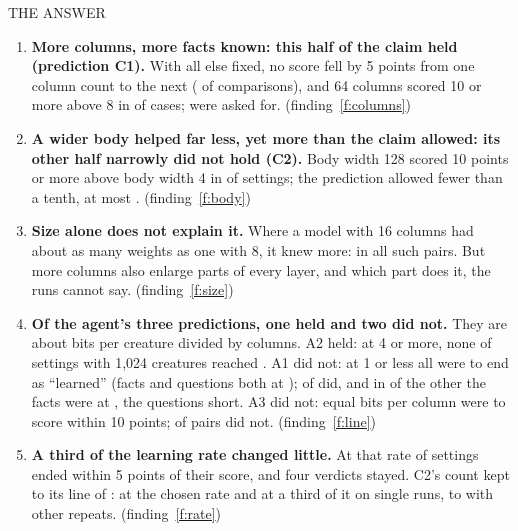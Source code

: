 \documentclass[10pt,letterpaper]{article}
\newcommand{\smallcaps}[1]{{\sffamily\fontsize{7.6}{9}\selectfont\color{second}\addfontfeature{LetterSpace=7}#1}}
\newcounter{finding}
\newcommand{\lead}[1]{\textbf{#1}}               %
\newcommand{\see}[1]{\mbox{\sffamily\footnotesize\color{second}(#1)}} %
\begin{document}
\begin{tcolorbox}[enhanced,colback=pale,colframe=pale,boxrule=0pt,arc=0pt,left=11pt,right=11pt,top=6pt,
  bottom=7pt,borderline west={2.2pt}{0pt}{ink},before skip=7pt,after skip=2pt]
\smallcaps{THE ANSWER}\par
\vspace{0.5pt}
\begin{enumerate}[leftmargin=1.35em,itemsep=2.5pt,topsep=1pt,label=\textbf{\arabic*.}]
\item \lead{More columns, more facts known: this half of the claim held (prediction C1).} With all else
      fixed, no score fell by 5 points from one column count to the next (\COneFalls{} of \COneComparisons{}
      comparisons), and 64 columns scored 10 or more above 8 in \COneGained{} of \COneCases{} cases;
      \COneNeeded{} were asked for. \see{finding~\ref{f:columns}}
\item \lead{A wider body helped far less, yet more than the claim allowed: its other half narrowly did not hold
      (C2).} Body width 128 scored 10 points or more above body width 4 in \CTwoGained{} of \CTwoCases{}
      settings; the prediction allowed fewer than a tenth, at most \CTwoAllowed. \see{finding~\ref{f:body}}
\item \lead{Size alone does not explain it.} Where a model with 16 columns had about as many weights as one
      with 8, it knew more: in all \SameSizePairs{} such pairs. But more columns also enlarge parts of every
      layer, and which part does it, the runs cannot say. \see{finding~\ref{f:size}}
\item \lead{Of the agent's three predictions, one held and two did not.} They are about bits per creature
      divided by columns. A2 held: at 4 or more, none of \ATwoCases{} settings with 1,024 creatures reached
      \ATwoBar. A1 did not: at 1 or less all were to end as ``learned'' (facts and questions both at
      \LearnedBar); \AOneLearned{} of \AOneCases{} did, and in \AOneQuestionsShort{} of the other \AOneMissed{}
      the facts were at \LearnedBar, the questions short. A3 did not: equal bits per column were to score
      within 10 points; \AThreeApart{} of \AThreeCases{} pairs did not. \see{finding~\ref{f:line}}
\item \lead{A third of the learning rate changed little.} At that rate \RcWithin{} of \RcRuns{} settings
      ended within 5 points of their score, and four verdicts stayed. C2's count kept to its line of
      \CTwoAllowed: \RcCTwoChosen{} at the chosen rate and \RcCTwoThird{} at a third of it on single runs,
      \CTwoSingleLow{} to \CTwoSingleHigh{} with other repeats. \see{finding~\ref{f:rate}}
\end{enumerate}
\end{tcolorbox}
\end{document}
